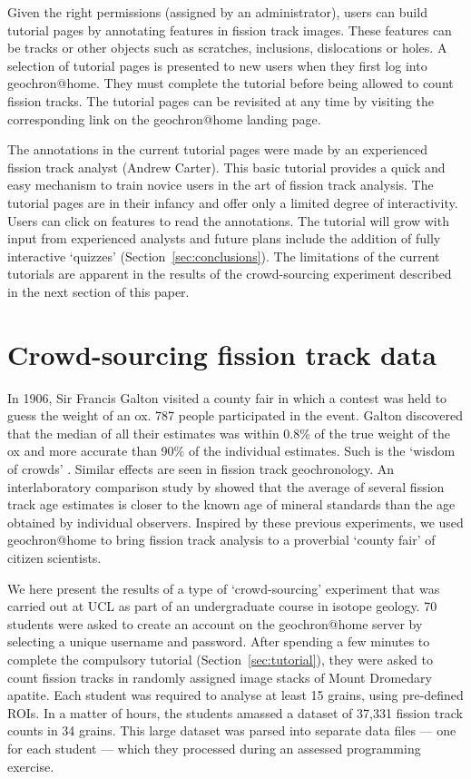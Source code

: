 \documentclass[gchron, manuscript]{copernicus}
\begin{document}
Given the right permissions (assigned by an administrator), users can
build tutorial pages by annotating features in fission track images.
These features can be tracks or other objects such as scratches,
inclusions, dislocations or holes. A selection of tutorial pages is
presented to new users when they first log into
geochron@home. They must complete the tutorial before being
allowed to count fission tracks.  The tutorial pages can be revisited
at any time by visiting the corresponding link on the
geochron@home landing page.\medskip

The annotations in the current tutorial pages were made by an
experienced fission track analyst (Andrew Carter). This basic tutorial
provides a quick and easy mechanism to train novice users in the art
of fission track analysis. The tutorial pages are in their infancy
and offer only a limited degree of interactivity. Users can click on
features to read the annotations. The tutorial will grow with input
from experienced analysts and future plans include the addition of
fully interactive `quizzes' (Section~\ref{sec:conclusions}). The
limitations of the current tutorials are apparent in the results of
the crowd-sourcing experiment described in the next section of this
paper.

\section{Crowd-sourcing fission track data}\label{sec:crowdsourcing}

In 1906, Sir Francis Galton visited a county fair in which a contest
was held to guess the weight of an ox. 787 people participated in the
event. Galton discovered that the median of all their estimates was
within 0.8\% of the true weight of the ox and more accurate than 90\%
of the individual estimates. Such is the `wisdom of crowds'
\citep{galton1907a}. Similar effects are seen in fission track
geochronology. An interlaboratory comparison study by
\citet{miller1985} showed that the average of several fission track
age estimates is closer to the known age of mineral standards than the
age obtained by individual observers. Inspired by these previous
experiments, we used geochron@home to bring fission track analysis to
a proverbial `county fair' of citizen scientists.\medskip

We here present the results of a type of `crowd-sourcing' experiment
that was carried out at UCL as part of an undergraduate course in
isotope geology. 70 students were asked to create an account on the
geochron@home server by selecting a unique username and
password. After spending a few minutes to complete the compulsory
tutorial (Section~\ref{sec:tutorial}), they were asked to count
fission tracks in randomly assigned image stacks of Mount Dromedary
apatite. Each student was required to analyse at least 15 grains,
using pre-defined ROIs. In a matter of hours, the students amassed a
dataset of 37,331 fission track counts in 34 grains.  This large
dataset was parsed into separate data files --- one for each student
--- which they processed during an assessed programming
exercise.\medskip
\end{document}
